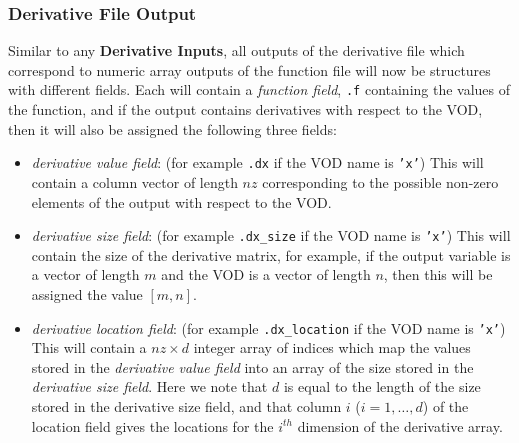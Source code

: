 \documentclass[10pt,pdftex]{article}
\begin{document}
\subsubsection{Derivative File Output}
Similar to any {\bf Derivative Inputs}, all outputs of the derivative file which correspond to numeric array outputs of the function file will now be structures with different fields. Each will contain a \emph{function field}, \texttt{.f} containing the values of the function, and if the output contains derivatives with respect to the VOD, then it will also be assigned the following three fields:
\begin{itemize}
\item \emph{derivative value field}: (for example \texttt{.dx} if the VOD name is \texttt{'x'}) This will contain a column vector of length $nz$ corresponding to the possible non-zero elements of the output with respect to the VOD.
\item \emph{derivative size field}: (for example \texttt{.dx\_size} if the VOD name is \texttt{'x'})
This will contain the size of the derivative matrix, for example, if the output variable is a vector of length $m$ and the VOD is a vector of length $n$, then this will be assigned the value $[m,n]$.
\item \emph{derivative location field}: (for example \texttt{.dx\_location} if the VOD name is \texttt{'x'})
This will contain a $nz \times d$ integer array of indices which map the values stored in the \emph{derivative value field} into an array of the size stored in the \emph{derivative size field}. Here we note that $d$ is equal to the length of the size stored in the derivative size field, and that column $i$ ($i = 1,\dots,d$) of the location field gives the locations for the $i^{th}$ dimension of the derivative array.
\end{itemize} 
\end{document}
